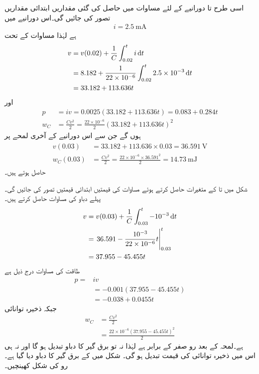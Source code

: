 اسی طرح  تا  دورانیے کے لئے مساوات  میں حاصل کی گئی مقداریں ابتدائی مقداریں تصور کی جائیں گی۔اس دورانیے میں
\begin{align*}
i=\SI{2.5}{\milli\ampere}
\end{align*}
ہے لہٰذا مساوات  کے تحت
\begin{align*}
v&=v(0.02)+\frac{1}{C}\int_{0.02}^t i \dif t\\
&=8.182 +\frac{1}{22\times 10^{-6}}\int_{0.02}^t 2.5\times 10^{-3} \dif t\\
&=33.182+113.636t
\end{align*}
اور
\begin{align*}
p&=iv=0.0025 (33.182+113.636t)=0.083+0.284t\\
w_C&=\frac{C v^2}{2}=\frac{22\times 10^{-6}}{2} (33.182+113.636t)^2
\end{align*}
ہوں گے جن سے اس دورانیے کے آخری لمحے پر
\begin{gather}
\begin{aligned}\label{مساوات_امالہ_ابتدائی_قیمتیں_ب}
v(0.03)&=33.182+113.636\times 0.03=\SI{36.591}{\volt}\\
w_C(0.03)&=\frac{Cv^2}{2}=\frac{22\times 10^{-6} \times 36.591^2}{2}=\SI{14.73}{\milli\joule}
\end{aligned}
\end{gather}
حاصل ہوتے ہیں۔

شکل  میں  تا  کے متغیرات حاصل کرتے ہوئے مساوات  کی قیمتیں ابتدائی قیمتیں تصور کی جائیں گی۔پہلے دباو کی مساوات حاصل کرتے ہیں۔
\begin{align*}
v&=v(0.03)+\frac{1}{C}\int_{0.03}^{t}-10^{-3} \dif t\\
&=\left. 36.591-\frac{10^{-3}}{22\times 10^{-6}}t\right|_{0.03}^{t}\\
&=37.955-45.455t
\end{align*}
طاقت کی مساوات درج ذیل ہے
\begin{align*}
p=&iv  \\
&=-0.001(37.955-45.455t)\\
&=-0.038+0.0455t
\end{align*}
جبکہ ذخیرہ توانائی
\begin{align*}
w_C&=\frac{Cv^2}{2}\\
&=\frac{22\times 10^{-6} (37.955-45.455t)^2}{2}
\end{align*}
ہے۔لمحہ  کے بعد رو صفر کے برابر ہے لہٰذا نہ تو برق گیر کا دباو تبدیل ہو گا اور نہ ہی اس میں ذخیرہ توانائی  کی قیمت تبدیل ہو گی۔
شکل  میں  کے برق گیر کا دباو دیا گیا ہے۔رو کی شکل کھینچیں۔

